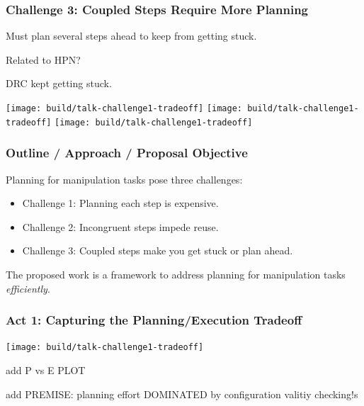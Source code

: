 \documentclass[serif]{beamer}
\begin{document}
\begin{frame}
   \frametitle{Challenge 3: Coupled Steps Require More Planning}

   Must plan several steps ahead to keep from getting stuck.
   
   Related to HPN?
   
   DRC kept getting stuck.
   
   \medskip
   \texttt{[image: build/talk-challenge1-tradeoff]}
   \texttt{[image: build/talk-challenge1-tradeoff]}
   \texttt{[image: build/talk-challenge1-tradeoff]}
   
\end{frame}

\begin{frame}
   \frametitle{Outline / Approach / Proposal Objective}
   
   Planning for manipulation tasks pose three challenges:
   
   \begin{itemize}
   \item Challenge 1: Planning each step is expensive.
   \item Challenge 2: Incongruent steps impede reuse.
   \item Challenge 3: Coupled steps make you get stuck or plan ahead.
   \end{itemize}
   
   The proposed work is a framework to address planning for
   manipulation tasks \emph{efficiently}.
   
\end{frame}

\begin{frame}
   \frametitle{Act 1: Capturing the Planning/Execution Tradeoff}
   
   \texttt{[image: build/talk-challenge1-tradeoff]}
   
   add P vs E PLOT
   
   add PREMISE: planning effort DOMINATED by configuration valitiy checking!s
\end{frame}
   
\end{document}
